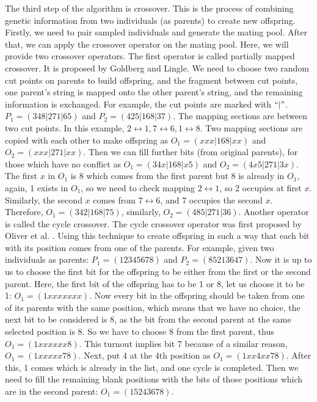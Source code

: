 \documentclass[letterpaper, 12 pt, conference]{ieeeconf}  %
\begin{document}
The third step of the algorithm is crossover. This is the process of combining genetic information from two individuals (as parents) to create new offspring. Firstly, we need to pair sampled individuals and generate the mating pool. After that, we can apply the crossover operator on the mating pool. Here, we will provide two crossover operators. The first operator is called partially mapped crossover. It is proposed by Goldberg and Lingle.\cite{Dgrl85} We need to choose two random cut points on parents to build offspring, and the fragment between cut points, one parent's string is mapped onto the other parent's string, and the remaining information is exchanged. For example, the cut points are marked with $``|"$. $P_1=(348|271|65)$ and $P_2=(425|168|37)$. The mapping sections are between two cut points. In this example, $2\leftrightarrow 1,7\leftrightarrow 6, 1\leftrightarrow 8$. Two mapping sections are copied with each other to make offspring as $O_1=(xxx|168|xx)$ and $O_2=(xxx|271|xx)$. Then we can fill further bits (from original parents), for those which have no conflict as $O_1=(34x|168|x5)$ and $O_2=(4x5|271|3x)$. The first $x$ in $O_1$ is 8 which comes from the first parent but 8 is already in $O_1$, again, 1 exists in $O_1$, so we need to check mapping $2\leftrightarrow 1$, so 2 occupies at first $x$. Similarly, the second $x$ comes from $7\leftrightarrow 6$, and 7 occupies the second $x$. Therefore, $O_1=(342|168|75)$, similarly, $O_2=(485|271|36)$. \cite{Ah17} Another operator is called the cycle crossover. The cycle crossover operator was first proposed by Oliver et al. \cite{Imo87}. Using this technique to create offspring in such a way that each bit with its position comes from one of the parents. For example, given two individuals as parents: $P_1=(12345678)$ and $P_2=(85213647)$. Now it is up to us to choose the first bit for the offspring to be either from the first or the second parent. Here, the first bit of the offspring has to be 1 or 8, let us choose it to be 1: $O_1=(1xxxxxxx)$. Now every bit in the offspring should be taken from one of its parents with the same position, which means that we have no choice, the next bit to be considered is 8, as the bit from the second parent at the same selected position is 8. So we have to choose 8 from the first parent, thus $O_1=(1xxxxxx8)$. This turnout implies bit 7 because of a similar reason, $O_1=(1xxxxx78)$. Next, put 4 at the 4th position as $O_1=(1xx4xx78)$. After this, 1 comes which is already in the list, and one cycle is completed. Then we need to fill the remaining blank positions with the bits of those positions which are in the second parent: $O_1=(15243678)$. \cite{Ah17}
\end{document}
